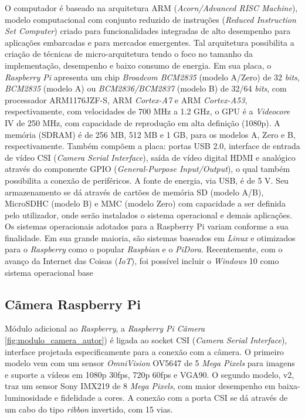 \documentclass[12pt,oneside,a4paper,chapter=TITLE,section=TITLE,sumario=tradicional]{abntex2}
\begin{document}
O computador é baseado na arquitetura ARM (\textit{Acorn/Advanced RISC Machine}), modelo computacional com conjunto reduzido de instruções (\textit{Reduced Instruction Set Computer}) criado para funcionalidades integradas de alto desempenho para aplicações embarcadas e para mercados emergentes.
Tal arquitetura possibilita a criação de técnicas de micro-arquitetura tendo o foco no tamanho da implementação, desempenho e baixo consumo de energia. Em sua placa, o \textit{Raspberry Pi} apresenta um chip \textit{Broadcom BCM2835} (modelo A/Zero) de 32 \textit{bits}, \textit{BCM2835} (modelo A) ou \textit{BCM2836/BCM2837} (modelo B) de 32/64 \textit{bits}, com processador ARM1176JZF-S, ARM \textit{Cortex-A7} e ARM \textit{Cortex-A53}, respectivamente, com velocidades de 700 MHz a 1.2 GHz, o GPU é a \textit{Videocore} IV de 250 MHz, com capacidade de reprodução em alta definição (1080p). A memória (SDRAM) é de 256 MB, 512 MB e 1 GB, para os modelos A, Zero e B, respectivamente. Também compõem a placa: portas USB 2.0, interface de entrada de vídeo CSI (\textit{Camera Serial Interface}), saída de vídeo digital HDMI e analógico através do componente GPIO (\textit{General-Purpose Input/Output}), o qual também possibilita a conexão de periféricos. A fonte de energia, via USB, é de 5 V.
Seu armazenamento se dá através de cartões de memória SD (modelo A/B), MicroSDHC (modelo B) e MMC (modelo Zero) com capacidade a ser definida pelo utilizador, onde serão instalados o sistema operacional e demais aplicações.
Os sistemas operacionais adotados para a Raspberry Pi variam conforme a sua finalidade. Em sua grande maioria, são sistemas baseados em \textit{Linux} e otimizados para o \textit{Raspberry} como o popular \textit{Raspbian} e o \textit{PiDora}. Recentemente, com o avanço da Internet das Coisas (\textit{IoT}), foi possível incluir o \textit{Windows} 10 como sistema operacional base

\subsection{Cãmera Raspberry Pi}
Módulo adicional ao \textit{Raspberry}, a \textit{Raspberry Pi Câmera} \autoref{fig:modulo_camera_autor}) é ligada ao socket CSI (\textit{Camera Serial Interface}), interface projetada especificamente para a conexão com a câmera. O primeiro modelo vem com um sensor \textit{OmniVision} OV5647 de 5 \textit{Mega Pixels} para imagens e suporte a vídeos em 1080p 30fps, 720p 60fps e VGA90. O segundo modelo, v2, traz um sensor Sony IMX219 de 8 \textit{Mega Pixels}, com maior desempenho em baixa-luminosidade e fidelidade a cores. A conexão com a porta CSI se dá através de um cabo do tipo \textit{ribbon} invertido, com 15 vias.
\end{document}
